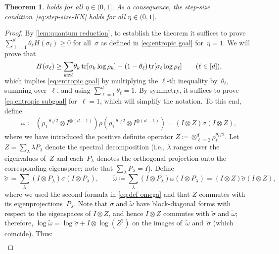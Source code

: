 \documentclass[11pt,letterpaper]{article}
\newtheorem{theorem}{Theorem}[section]
\numberwithin{equation}{section}
\newcommand{\ot}{\otimes}
\DeclareMathOperator{\tr}{tr}
\begin{document}
\begin{theorem}\label{thm:quantum}
 holds for all $\eta\in(0,1]$.
As a consequence, the step-size condition~\eqref{eq:step-size-KN} holds for all $\eta\in(0,1]$.
\end{theorem}
\begin{proof}
By \cref{lem:quantum reduction}, to establish the theorem it suffices to prove $\sum_{\ell=1}^d \theta_\ell H(\sigma_\ell) \geq 0$ for all~$\sigma$ as defined in \cref{eq:entropic goal} for~$\eta=1$.
We will prove that
\begin{equation}\label{eq:entropic subgoal}
    H(\sigma_\ell) \geq \smash{\sum_{k \neq \ell}} \theta_k \tr\mleft[ \sigma_k \log \rho_k \mright] - (1-\theta_\ell) \tr[\sigma_\ell \log \rho_\ell] \qquad (\ell\in[d]),
\end{equation}
which implies \cref{eq:entropic goal} by multiplying the $\ell$-th inequality by~$\theta_\ell$, summing over~$\ell$, and using $\sum_{\ell=1}^d\theta_\ell=1$.
By symmetry, it suffices to prove \cref{eq:entropic subgoal} for~$\ell=1$, which will simplify the notation.
To this end, define
\begin{align}\label{eq:def omega}
    \omega
\coloneqq ( \rho_1^{-\theta_1/2} \ot I^{\ot(d-1)} ) \rho ( \rho_1^{-\theta_1/2} \ot I^{\ot(d-1)} )
= (I \ot Z) \sigma (I \ot Z),
\end{align}
where we have introduced the positive definite operator $Z \coloneqq \otimes_{\ell=2}^d \rho_\ell^{\theta_\ell/2}$.
Let $Z = \sum_\lambda \lambda P_\lambda$ denote the spectral decomposition (i.e., $\lambda$ ranges over the eigenvalues of~$Z$ and each~$P_\lambda$ denotes the orthogonal projection onto the corresponding eigenspace; note that $\sum_\lambda P_\lambda=I$).
Define
\[
    \tilde\sigma \coloneqq \sum_\lambda (I \ot P_\lambda) \sigma (I \ot P_\lambda),
\qquad \tilde\omega \coloneqq \sum_\lambda (I \ot P_\lambda) \omega (I \ot P_\lambda)
= (I \ot Z) \tilde\sigma (I \ot Z),
\]
where we used the second formula in \cref{eq:def omega} and that $Z$ commutes with its eigenprojections~$P_\lambda$.
Note that $\tilde\sigma$ and $\tilde\omega$ have block-diagonal forms with respect to the eigenspaces of $I\otimes Z$, and hence $I \ot Z$ commutes with $\tilde\sigma$ and $\tilde\omega$; therefore,
$\log \tilde\omega = \log \tilde\sigma + I \ot \log(Z^2)$ on the images of~$\tilde\omega$ and~$\tilde\sigma$ (which coincide).
Thus:
\begin{align}\label{eq:DPI left}

\end{align}
\end{proof}
\end{document}
